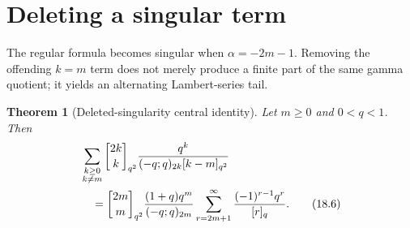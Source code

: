 \documentclass[11pt,oneside,openany]{book}
\newtheorem{theorem}{Theorem}[chapter]
\theoremstyle{definition}
\theoremstyle{remark}
\newcommand{\Qbinom}[3]{\genfrac{[}{]}{0pt}{}{#1}{#2}_{#3}}
\begin{document}
\section{Deleting a singular term}

The regular formula becomes singular when $\alpha=-2m-1$.  Removing the offending $k=m$ term does not merely produce a finite part of the same gamma quotient; it yields an alternating Lambert-series tail.

\begin{theorem}[Deleted-singularity central identity]\label{thm:singular-central}
Let $m\ge0$ and $0<q<1$.  Then
\begin{align}
 &\sum_{\substack{k\ge0\\k\ne m}}
 \Qbinom{2k}{k}{q^2}
 \frac{q^k}{(-q;q)_{2k}[k-m]_{q^2}}
 \notag\\
 &\quad=
 \Qbinom{2m}{m}{q^2}
 \frac{(1+q)q^m}{(-q;q)_{2m}}
 \sum_{r=2m+1}^{\infty}
 \frac{(-1)^{r-1}q^r}{[r]_q}.
 \tag{18.6}\label{eq:singular-central}
\end{align}
\end{theorem}
\end{document}
